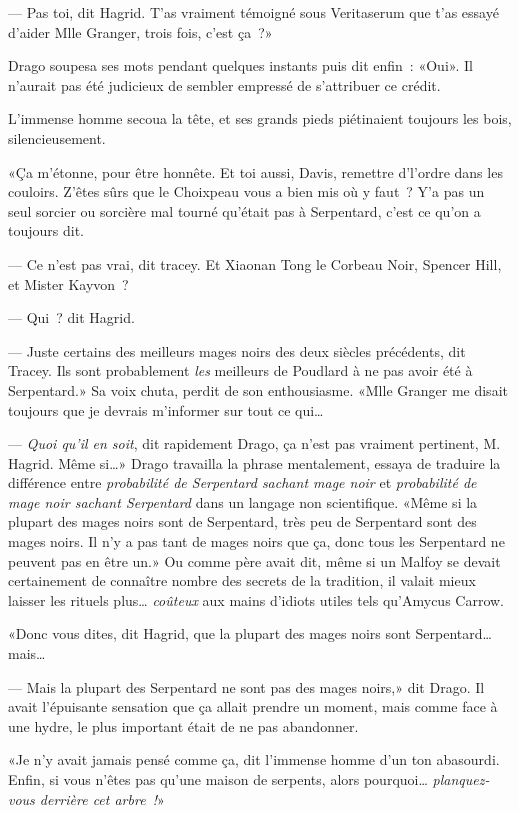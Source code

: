 --- Pas toi, dit Hagrid. T'as vraiment témoigné sous Veritaserum que t'as essayé d'aider Mlle Granger, trois fois, c'est ça~?»

Drago soupesa ses mots pendant quelques instants puis dit enfin~: «Oui». Il n'aurait pas été judicieux de sembler empressé de s'attribuer ce crédit.

L'immense homme secoua la tête, et ses grands pieds piétinaient toujours les bois, silencieusement.

«Ça m'étonne, pour être honnête. Et toi aussi, Davis, remettre d'l'ordre dans les couloirs. Z'êtes sûrs que le Choixpeau vous a bien mis où y faut~? Y'a pas un seul sorcier ou sorcière mal tourné qu'était pas à Serpentard, c'est ce qu'on a toujours dit.

--- Ce n'est pas vrai, dit tracey. Et Xiaonan Tong le Corbeau Noir, Spencer Hill, et Mister Kayvon~?

--- Qui~? dit Hagrid.

--- Juste certains des meilleurs mages noirs des deux siècles précédents, dit Tracey. Ils sont probablement \emph{les} meilleurs de Poudlard à ne pas avoir été à Serpentard.» Sa voix chuta, perdit de son enthousiasme. «Mlle Granger me disait toujours que je devrais m'informer sur tout ce qui…

--- \emph{Quoi qu'il en soit}, dit rapidement Drago, ça n'est pas vraiment pertinent, M. Hagrid. Même si…» Drago travailla la phrase mentalement, essaya de traduire la différence entre \emph{probabilité de Serpentard sachant mage noir} et \emph{probabilité de mage noir sachant Serpentard} dans un langage non scientifique. «Même si la plupart des mages noirs sont de Serpentard, très peu de Serpentard sont des mages noirs. Il n'y a pas tant de mages noirs que ça, donc tous les Serpentard ne peuvent pas en être un.» Ou comme père avait dit, même si un Malfoy se devait certainement de connaître nombre des secrets de la tradition, il valait mieux laisser les rituels plus… \emph{coûteux} aux mains d'idiots utiles tels qu'Amycus Carrow.

«Donc vous dites, dit Hagrid, que la plupart des mages noirs sont Serpentard… mais…

--- Mais la plupart des Serpentard ne sont pas des mages noirs,» dit Drago. Il avait l'épuisante sensation que ça allait prendre un moment, mais comme face à une hydre, le plus important était de ne pas abandonner.

«Je n'y avait jamais pensé comme ça, dit l'immense homme d'un ton abasourdi. Enfin, si vous n'êtes pas qu'une maison de serpents, alors pourquoi… \emph{planquez-vous derrière cet arbre~!}»

